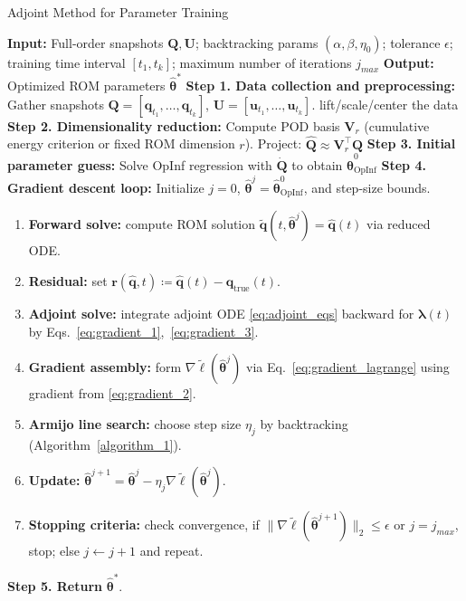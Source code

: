 \begin{center}
\begin{minipage}{0.95\textwidth}
\begin{algorithm}[H]
\caption{Adjoint Method for Parameter Training}\label{algorithm_2}
\SetAlgoNoLine
\textbf{Input:} Full-order snapshots $\mathbf{Q},\mathbf{U}$; backtracking params $(\alpha,\beta,\eta_0)$; tolerance $\epsilon$; training time interval $[t_1, t_k]$; maximum number of iterations $j_{max}$\;
\textbf{Output:} Optimized ROM parameters $\hat{\bm\theta}^*$\;
\vspace{0.3cm}
\textbf{Step 1. Data collection and preprocessing:} Gather snapshots $\mathbf{Q}=[\mathbf{q}_{t_1},\dots,\mathbf{q}_{t_k}]$, $\mathbf{U}=[\mathbf{u}_{t_1},\dots,\mathbf{u}_{t_k}]$.
\quad [Optional] lift/scale/center the data\;
\textbf{Step 2. Dimensionality reduction:} Compute POD basis $\mathbf{V}_r$ (cumulative energy criterion or fixed ROM dimension $r$). Project: $\hat{\mathbf{Q}} \approx \mathbf{V}_r^\top\mathbf{Q}$\;
\textbf{Step 3. Initial parameter guess:} Solve OpInf regression with $\dot{\mathbf{Q}}$ to obtain $\hat{\bm\theta}^{0}_{\text{OpInf}}$\;
\textbf{Step 4. Gradient descent loop:}
Initialize $j=0$, $\hat{\bm\theta}^j=\hat{\bm\theta}^{0}_{\text{OpInf}}$, and step-size bounds.
\begin{enumerate}[label=\arabic*.]
  \item \textbf{Forward solve:}
    compute ROM solution $\tilde{\mathbf{q}}(t,\hat{\bm\theta}^j) = \hat{\mathbf{q}}(t)$ via reduced ODE.
  \item \textbf{Residual:}
    set $\mathbf{r}(\hat{\mathbf{q}},t)\coloneqq\hat{\mathbf{q}}(t) - \hat{\mathbf{q}}_{\text{true}}(t)$.
  \item \textbf{Adjoint solve:}
    integrate adjoint ODE \eqref{eq:adjoint_eqs} backward for $\bm\lambda(t)$ by Eqs.~\eqref{eq:gradient_1},~\eqref{eq:gradient_3}.
  \item \textbf{Gradient assembly:}
    form $\nabla\tilde\ell(\hat{\bm\theta}^j)$ via Eq.~\eqref{eq:gradient_lagrange} using gradient from \eqref{eq:gradient_2}.
  \item \textbf{Armijo line search:}
    choose step size $\eta_j$ by backtracking (Algorithm~\ref{algorithm_1}).
  \item \textbf{Update:}
    $\hat{\bm\theta}^{j+1}=\hat{\bm\theta}^j-\eta_j\nabla\tilde\ell(\hat{\bm\theta}^j)$.
  \item \textbf{Stopping criteria:}
    check convergence, if $\|\nabla\tilde\ell(\hat{\bm\theta}^{j+1})\|_2\le\epsilon$ or $j=j_{max}$, stop; else $j\leftarrow j+1$ and repeat.
\end{enumerate}
\textbf{Step 5. Return} {$\hat{\bm\theta}^*$}.
\end{algorithm}
\end{minipage}
\end{center}
    

